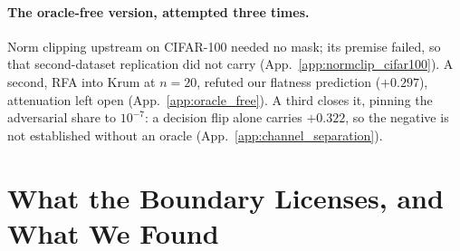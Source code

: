 \documentclass{article}
\begin{document}
\paragraph{The oracle-free version, attempted three times.} Norm clipping upstream on CIFAR-100 needed no mask; its premise failed, so that second-dataset replication did not carry (App.~\ref{app:normclip_cifar100}). A second, RFA into Krum at $n{=}20$, refuted our flatness prediction ($+0.297$), attenuation left open (App.~\ref{app:oracle_free}). A third closes it, pinning the adversarial share to $10^{-7}$: a decision flip alone carries $+0.322$, so the negative is not established without an oracle (App.~\ref{app:channel_separation}).

\section{What the Boundary Licenses, and What We Found}
\label{sec:validation}
\end{document}
